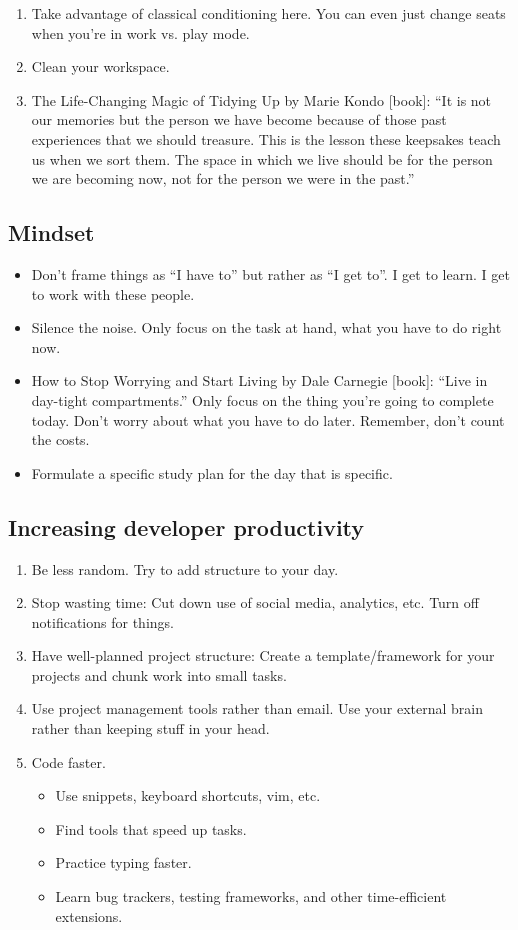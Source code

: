\begin{enumerate}
	\item Take advantage of classical conditioning here. You can even just change seats when you're in work vs. play mode. 
	\item Clean your workspace. 
	\item The Life-Changing Magic of Tidying Up by Marie Kondo [book]: ``It is not our memories but the person we have become because of those past experiences that we should treasure. This is the lesson these keepsakes teach us when we sort them. The space in which we live should be for the person we are becoming now, not for the person we were in the past.''
\end{enumerate}

\subsection{Mindset}

\begin{itemize}
	\item Don't frame things as ``I have to'' but rather as ``I get to''. I get to learn. I get to work with these people. 
	\item Silence the noise. Only focus on the task at hand, what you have to do right now. 
	\item How to Stop Worrying and Start Living by Dale Carnegie [book]: ``Live in day-tight compartments.'' Only focus on the thing you're going to complete today. Don't worry about what you have to do later. Remember, don't count the costs. 
	\item Formulate a specific study plan for the day that is specific. 
\end{itemize}


\subsection*{Increasing developer productivity}
\begin{enumerate}
	\item Be less random. Try to add structure to your day. 
	\item Stop wasting time: Cut down use of social media, analytics, etc. Turn off notifications for things. 
	\item Have well-planned project structure: Create a template/framework for your projects and chunk work into small tasks. 
	\item Use project management tools rather than email. Use your external brain rather than keeping stuff in your head. 
	\item Code faster. 
	\begin{itemize}
		\item Use snippets, keyboard shortcuts, vim, etc. 
		\item Find tools that speed up tasks. 
		\item Practice typing faster.
		\item Learn bug trackers, testing frameworks, and other time-efficient extensions. 
	\end{itemize}
\end{enumerate}

